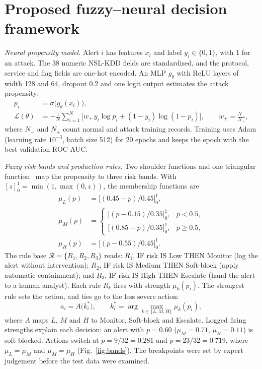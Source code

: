 \documentclass[preprint,12pt]{elsarticle}
\begin{document}
\section{Proposed fuzzy--neural decision framework}
\label{sec:method}
\textit{Neural propensity model.} Alert $i$ has features $x_i$ and label $y_i\in\{0,1\}$, with 1 for an attack. The 38 numeric NSL-KDD fields are standardised, and the protocol, service and flag fields are one-hot encoded. An MLP $g_\theta$ with ReLU layers of width 128 and 64, dropout 0.2 and one logit output estimates the attack propensity:
\begin{equation}
\begin{split}
p_i&=\sigma\big(g_\theta(x_i)\big),\\
\mathcal{L}(\theta)&=-\frac{1}{N}\sum_{i=1}^{N}\Big[w_{+}\,y_i\log p_i+(1-y_i)\log(1-p_i)\Big],\qquad w_{+}=\frac{N_{-}}{N_{+}},
\end{split}
\label{eq:mlp}
\end{equation}
where $N_{-}$ and $N_{+}$ count normal and attack training records. Training uses Adam (learning rate $10^{-3}$, batch size 512) for 20 epochs and keeps the epoch with the best validation ROC-AUC.

\textit{Fuzzy risk bands and production rules.} Two shoulder functions and one triangular function~\cite{zadeh1965} map the propensity to three risk bands. With $[z]_0^1=\min(1,\max(0,z))$, the membership functions are
\begin{align}
\mu_L(p)&=\big[(0.45-p)/0.45\big]_0^1, \label{eq:muL}\\
\mu_M(p)&=\begin{cases}\big[(p-0.15)/0.35\big]_0^1, & p<0.5,\\ \big[(0.85-p)/0.35\big]_0^1, & p\ge 0.5,\end{cases} \label{eq:muM}\\
\mu_H(p)&=\big[(p-0.55)/0.45\big]_0^1. \label{eq:muH}
\end{align}
The rule base $\mathcal{R}=\{R_1,R_2,R_3\}$ reads: $R_1$, IF risk IS Low THEN Monitor (log the alert without intervention); $R_2$, IF risk IS Medium THEN Soft-block (apply automatic containment); and $R_3$, IF risk IS High THEN Escalate (hand the alert to a human analyst).
Each rule $R_k$ fires with strength $\mu_k(p_i)$. The strongest rule sets the action, and ties go to the less severe action:
\begin{equation}
a_i = A\big(k_i^{*}\big),\qquad k_i^{*}=\arg\max_{k\in\{L,M,H\}}\mu_k(p_i),
\label{eq:rule}
\end{equation}
where $A$ maps $L$, $M$ and $H$ to Monitor, Soft-block and Escalate. Logged firing strengths explain each decision: an alert with $p=0.60$ ($\mu_M=0.71$, $\mu_H=0.11$) is soft-blocked. Actions switch at $p=9/32=0.281$ and $p=23/32=0.719$, where $\mu_L=\mu_M$ and $\mu_M=\mu_H$ (Fig.~\ref{fig:bands}). The breakpoints were set by expert judgement before the test data were examined.
\end{document}
